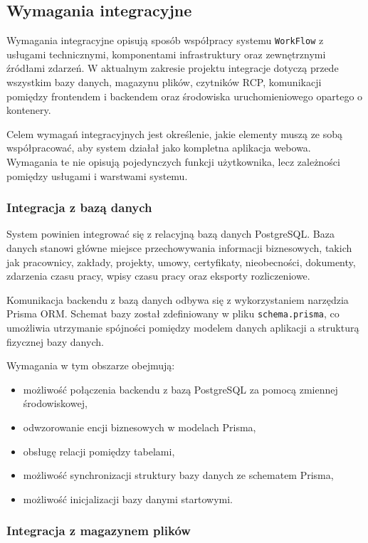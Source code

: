 \subsection{Wymagania integracyjne}

Wymagania integracyjne opisują sposób współpracy systemu \texttt{WorkFlow} z usługami technicznymi, komponentami infrastruktury oraz zewnętrznymi źródłami zdarzeń. W aktualnym zakresie projektu integracje dotyczą przede wszystkim bazy danych, magazynu plików, czytników RCP, komunikacji pomiędzy frontendem i backendem oraz środowiska uruchomieniowego opartego o kontenery.

Celem wymagań integracyjnych jest określenie, jakie elementy muszą ze sobą współpracować, aby system działał jako kompletna aplikacja webowa. Wymagania te nie opisują pojedynczych funkcji użytkownika, lecz zależności pomiędzy usługami i warstwami systemu.

\subsubsection{Integracja z bazą danych}

System powinien integrować się z relacyjną bazą danych PostgreSQL. Baza danych stanowi główne miejsce przechowywania informacji biznesowych, takich jak pracownicy, zakłady, projekty, umowy, certyfikaty, nieobecności, dokumenty, zdarzenia czasu pracy, wpisy czasu pracy oraz eksporty rozliczeniowe.

Komunikacja backendu z bazą danych odbywa się z wykorzystaniem narzędzia Prisma ORM. Schemat bazy został zdefiniowany w pliku \texttt{schema.prisma}, co umożliwia utrzymanie spójności pomiędzy modelem danych aplikacji a strukturą fizycznej bazy danych.

Wymagania w tym obszarze obejmują:
\begin{itemize}
    \item możliwość połączenia backendu z bazą PostgreSQL za pomocą zmiennej środowiskowej,
    \item odwzorowanie encji biznesowych w modelach Prisma,
    \item obsługę relacji pomiędzy tabelami,
    \item możliwość synchronizacji struktury bazy danych ze schematem Prisma,
    \item możliwość inicjalizacji bazy danymi startowymi.
\end{itemize}

\subsubsection{Integracja z magazynem plików}

